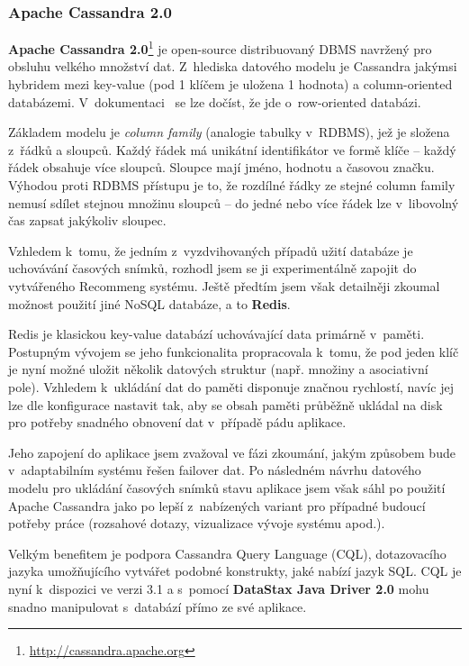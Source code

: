 \documentclass[thesis=M,czech]{FITthesis}[2014/05/07]
\begin{document}
\subsubsection{Apache Cassandra 2.0}
\textbf{Apache Cassandra 2.0}\footnote{\url{http://cassandra.apache.org}} je open-source distribuovaný DBMS navržený pro obsluhu velkého množství dat. Z~hlediska datového modelu je Cassandra jakýmsi hybridem mezi key-value (pod 1 klíčem je uložena 1 hodnota) a column-oriented databázemi. V~dokumentaci~\cite{cassdoc} se lze dočíst, že jde o~row-oriented databázi.

Základem modelu je \emph{column family} (analogie tabulky v~RDBMS), jež je složena z~řádků a sloupců. Každý řádek má unikátní identifikátor ve formě klíče – každý řádek obsahuje více sloupců. Sloupce mají jméno, hodnotu a časovou značku. Výhodou proti RDBMS přístupu je to, že rozdílné řádky ze stejné column family nemusí sdílet stejnou množinu sloupců – do jedné nebo více řádek lze v~libovolný čas zapsat jakýkoliv sloupec.

Vzhledem k~tomu, že jedním z~vyzdvihovaných případů užití databáze je uchovávání časových snímků, rozhodl jsem se ji experimentálně zapojit do vytvářeného Recommeng systému. Ještě předtím jsem však detailněji zkoumal možnost použití jiné NoSQL databáze, a to \textbf{Redis}. 

Redis je klasickou key-value databází uchovávající data primárně v~paměti. Postupným vývojem se jeho funkcionalita propracovala k~tomu, že pod jeden klíč je nyní možné uložit několik datových struktur (např. množiny a asociativní pole). Vzhledem k~ukládání dat do paměti disponuje značnou rychlostí, navíc jej lze dle konfigurace nastavit tak, aby se obsah paměti průběžně ukládal na disk pro potřeby snadného obnovení dat v~případě pádu aplikace.

Jeho zapojení do aplikace jsem zvažoval ve fázi zkoumání, jakým způsobem bude v~adaptabilním systému řešen failover dat. Po následném návrhu datového modelu pro ukládání časových snímků stavu aplikace jsem však sáhl po použití Apache Cassandra jako po lepší z~nabízených variant pro případné budoucí potřeby práce (rozsahové dotazy, vizualizace vývoje systému apod.). 

Velkým benefitem je podpora Cassandra Query Language (CQL), dotazovacího jazyka umožňujícího vytvářet podobné konstrukty, jaké nabízí jazyk SQL. CQL je nyní k~dispozici ve verzi 3.1 a s~pomocí \textbf{DataStax Java Driver 2.0} mohu snadno manipulovat s~databází přímo ze své aplikace. 
\end{document}
